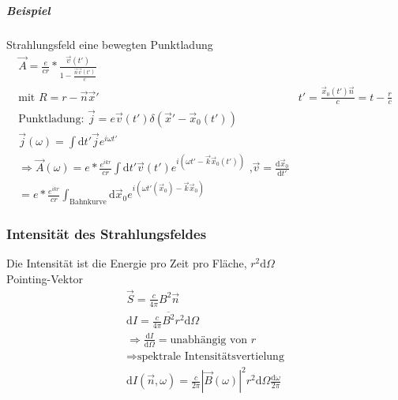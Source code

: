 \documentclass[a4paper]{article}
\begin{document}
\subparagraph{Beispiel}
Strahlungsfeld eine bewegten Punktladung
\begin{align}
\vec{A}=\frac{e}{cr}*\frac{\vec{v}(t')}{1-\frac{\vec{n}\vec{v}(t')}{c}}\\
\text{mit }R=r-\vec{n}\vec{x}' &
t'=\frac{\vec{x}_0(t')\vec{n}}{c}=t-\frac{r}{c}\\
\text{Punktladung: } \vec{j}=e\vec{v}(t')\delta(\vec{x}'-\vec{x}_0(t'))\\
\vec{j}(\omega)=\int \mathrm{d}t' \vec{j} e^{i\omega t'}\\
\Rightarrow \vec{A}(\omega)=e*\frac{e^{ikr}}{cr}\int \mathrm{d}t' \vec{v}(t')e^{i\left(
\omega t'-\vec{k}\vec{x}_0(t') \right)}\text{ ,
}\vec{v}=\frac{\mathrm{d}\vec{x}_0}{\mathrm{d}t'}\\
=e*\frac{e^{ikr}}{cr}\int_{\text{Bahnkurve}} \mathrm{d}\vec{x}_0 e^{i\left(
\omega t'(\vec{x}_0)-\vec{k}\vec{x}_0 \right)}
\end{align}
\subsubsection{Intensität des Strahlungsfeldes}
Die Intensität ist die Energie pro Zeit pro Fläche, $r^2\mathrm{d}\Omega$\\
Pointing-Vektor 
\begin{align}
\vec{S}=\frac{c}{4\pi}B^2\vec{n}\\
\mathrm{d}I=\frac{c}{4\pi}\overline{B^2}r^2\mathrm{d}\Omega\\
\Rightarrow \frac{\mathrm{d}I}{\mathrm{d}\Omega}= \text{unabhängig von }r\\
\Rightarrow \text{spektrale Intensitätsvertielung}\\
\mathrm{d}I(\vec{n},\omega)=\frac{c}{2\pi}|\vec{B}(\omega)|^2r^2\mathrm{d}\Omega
\frac{\mathrm{d}\omega}{2\pi}
\end{align} 
\end{document}
